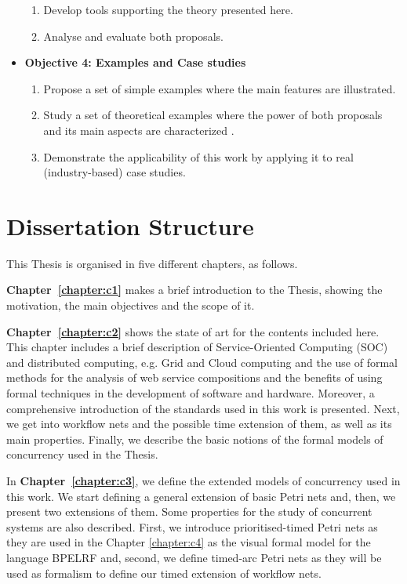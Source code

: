\begin{itemize}
\begin{enumerate}
\item Develop tools supporting the theory presented here.

\item Analyse and evaluate both proposals.

\end{enumerate}

\item \textbf{Objective 4: Examples and Case studies}

\begin{enumerate}

\item Propose a set of simple examples where the main features are illustrated.
\item Study a set of theoretical examples where the power of both proposals and its main aspects are characterized .
\item Demonstrate the applicability of this work by applying it to real (industry-based) case studies.
\end{enumerate}

\end{itemize}

\section{Dissertation Structure}\label{structure}

This Thesis is organised in five different chapters, as follows.

\textbf{Chapter~\ref{chapter:c1}} makes a brief introduction to the Thesis, showing the motivation, the main objectives and the scope of it.

\textbf{Chapter~\ref{chapter:c2}} shows the state of art for the contents included here. This chapter includes a brief description of Service-Oriented Computing (SOC) and distributed computing, e.g. Grid and Cloud computing and the use of formal methods for the analysis of web service compositions and the benefits of using formal techniques in the development of software and hardware. Moreover, a comprehensive introduction of the standards used in this work is presented. Next, we get into workflow nets and the possible time extension of them, as well as its main properties. Finally, we describe the basic notions of the formal models of concurrency used in the Thesis.

In \textbf{Chapter~\ref{chapter:c3}}, we define the extended models of concurrency used in this work. We start defining a 
general extension of basic Petri nets and, then, we present two extensions of them. Some properties for the study of concurrent systems are also described. 
First, we introduce prioritised-timed Petri nets as they are used in 
the Chapter \ref{chapter:c4} as the visual formal model for the language BPELRF and, second, we define timed-arc Petri nets as they will be used as formalism
to define our timed extension of workflow nets. 

